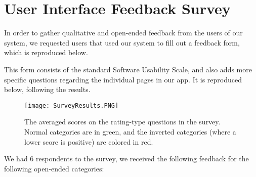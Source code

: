 \documentclass[12pt,letterpaper,titlepage]{article}
\begin{document}
\newpage
\section{User Interface Feedback Survey} \label{tab:UserInterfaceFeedbackSurvey}

In order to gather qualitative and open-ended feedback from the users of our system, we requested users that used our system to fill out a feedback form, which is reproduced below.

This form consists of the standard Software Usability Scale, and also adds more specific questions regarding the individual pages in our app. It is reproduced below, following the results.

\begin{figure}[h!]
\begin{center}
\texttt{[image: SurveyResults.PNG]}
\caption{The averaged scores on the rating-type questions in the survey. Normal categories are in green, and the inverted categories (where a lower score is positive) are colored in red.}
\end{center}
\end{figure}

We had 6 respondents to the survey, we received the following feedback for the following open-ended categories:
\end{document}
